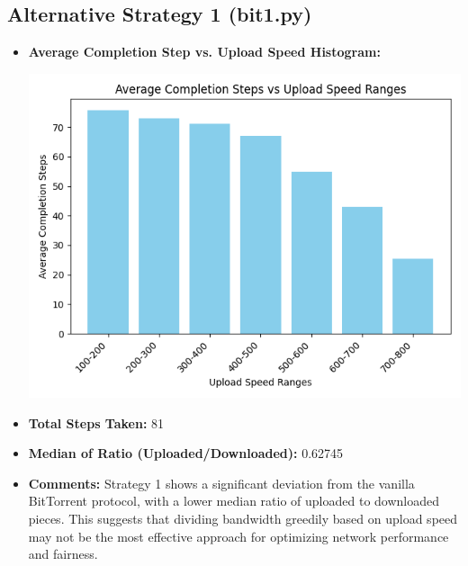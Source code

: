 \documentclass{article}
\begin{document}
\subsection{Alternative Strategy 1 (bit1.py)}
\begin{itemize}
\item \textbf{Average Completion Step vs. Upload Speed Histogram:} 

\includegraphics[width=\linewidth]{graphs/bit1.png}
\item \textbf{Total Steps Taken:} 81
\item \textbf{Median of Ratio (Uploaded/Downloaded):} 0.62745
\item \textbf{Comments:} Strategy 1 shows a significant deviation from the vanilla BitTorrent protocol, with a lower median ratio of uploaded to downloaded pieces. This suggests that dividing bandwidth greedily based on upload speed may not be the most effective approach for optimizing network performance and fairness.
\end{itemize}

\newpage
\end{document}
